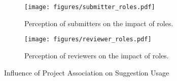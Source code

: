 \begin{figure*}[t]
\centering
\begin{subfigure}[b]{0.4\textwidth}
    \texttt{[image: figures/submitter\_roles.pdf]}
    \caption{Perception of submitters on the impact of roles.}
    \label{fig:submitter_perception}
\end{subfigure}
\hspace{2em}
\begin{subfigure}[b]{0.4\textwidth}
    \texttt{[image: figures/reviewer\_roles.pdf]}
    \caption{Perception of reviewers on the impact of roles.}
    \label{fig:survey_data}
\end{subfigure}
\caption{Influence of Project Association on Suggestion Usage}
\label{fig:roles2}
\end{figure*}